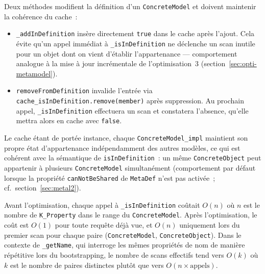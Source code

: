 Deux méthodes modifient la définition d'un \texttt{ConcreteModel} et
doivent maintenir la cohérence du cache~:

\begin{itemize}
    \item \texttt{\_addInDefinition} insère directement \texttt{true}
    dans le cache après l'ajout. Cela évite qu'un appel immédiat à
    \texttt{\_isInDefinition} ne déclenche un scan inutile pour un objet
    dont on vient d'établir l'appartenance --- comportement analogue à la
    mise à jour incrémentale de l'optimisation~3
    (section~\ref{sec:opti-metamodel}).

    \item \texttt{removeFromDefinition} invalide l'entrée via
    \texttt{cache\_isInDefinition.remove(member)} après suppression. Au
    prochain appel, \texttt{\_isInDefinition} effectuera un scan et
    constatera l'absence, qu'elle mettra alors en cache avec
    \texttt{false}.
\end{itemize}

Le cache étant de portée instance, chaque \texttt{ConcreteModel\_impl}
maintient son propre état d'appartenance indépendamment des autres
modèles, ce qui est cohérent avec la sémantique de
\texttt{isInDefinition}~: un même \texttt{ConcreteObject} peut appartenir
à plusieurs \texttt{ConcreteModel} simultanément
(comportement par défaut lorsque la propriété
\texttt{canNotBeShared} de \texttt{MetaDef} n'est pas activée~;
cf.~section~\ref{sec:metal2}).

Avant l'optimisation, chaque appel à \texttt{\_isInDefinition} coûtait
$O(n)$ où $n$ est le nombre de \texttt{K\_Property} dans le range du
\texttt{ConcreteModel}. Après l'optimisation, le coût est $O(1)$ pour
toute requête déjà vue, et $O(n)$ uniquement lors du premier scan pour
chaque paire (\texttt{ConcreteModel}, \texttt{ConcreteObject}). Dans le
contexte de \texttt{\_getName}, qui interroge les mêmes propriétés de
nom de manière répétitive lors du bootstrapping, le nombre de scans
effectifs tend vers $O(k)$ où $k$ est le nombre de paires distinctes
plutôt que vers $O(n \times \text{appels})$.

